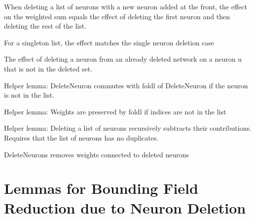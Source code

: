 \begin{theorem}
\begin{theorem}
\begin{lemma}
\begin{definition}\label{delete_cons_neuron_step}
When deleting a list of neurons with a new neuron added at the front, the effect
    on the weighted sum equals the effect of deleting the first neuron and then
    deleting the rest of the list.
\leanok
\end{definition}

\begin{definition}\label{delete_singleton_neuron_step}
\uses{}
For a singleton list, the effect matches the single neuron deletion case
\leanok
\end{definition}

\begin{definition}\label{delete_neuron_from_deleted_network}
The effect of deleting a neuron from an already deleted network on a neuron u that
is not in the deleted set.
\leanok
\end{definition}

\begin{definition}\label{commute_delete_foldl}
\leanok
Helper lemma: DeleteNeuron commutes with foldl of DeleteNeuron if the neuron is not in the list.
\end{definition}


\begin{definition}\label{foldl_delete_preserves_weights}
\leanok
Helper lemma: Weights are preserved by foldl if indices are not in the list
\end{definition}

\begin{definition}\label{delete_neurons_recursive}
\leanok
Helper lemma: Deleting a list of neurons recursively subtracts their contributions.
    Requires that the list of neurons has no duplicates.
\end{definition}

\begin{definition}\label{deleted_neurons_field_effect}
\leanok
DeleteNeurons removes weights connected to deleted neurons 
\end{definition}

\section{Lemmas for Bounding Field Reduction due to Neuron Deletion}


\end{lemma}
\end{theorem}
\end{theorem}
